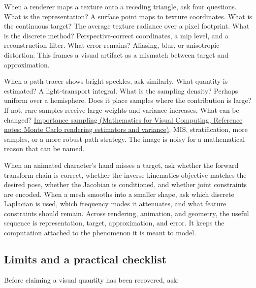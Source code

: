 When a renderer maps a texture onto a receding triangle, ask four questions. What is the representation? A surface point maps to texture coordinates. What is the continuous target? The average texture radiance over a pixel footprint. What is the discrete method? Perspective-correct coordinates, a mip level, and a reconstruction filter. What error remains? Aliasing, blur, or anisotropic distortion. This frames a visual artifact as a mismatch between target and approximation.

When a path tracer shows bright speckles, ask similarly. What quantity is estimated? A light-transport integral. What is the sampling density? Perhaps uniform over a hemisphere. Does it place samples where the contribution is large? If not, rare samples receive large weights and variance increases. What can be changed? \href{../02-Mathematics-for-Visual-Computing/main.pdf\#nameddest=appendix-031e02bf28af}{Importance sampling (Mathematics for Visual Computing, Reference notes: Monte Carlo rendering estimators and variance)}, MIS, stratification, more samples, or a more robust path strategy. The image is noisy for a mathematical reason that can be named.

When an animated character's hand misses a target, ask whether the forward transform chain is correct, whether the inverse-kinematics objective matches the desired pose, whether the Jacobian is conditioned, and whether joint constraints are encoded. When a mesh smooths into a smaller shape, ask which discrete Laplacian is used, which frequency modes it attenuates, and what feature constraints should remain. Across rendering, animation, and geometry, the useful sequence is representation, target, approximation, and error. It keeps the computation attached to the phenomenon it is meant to model.

\subsection{Limits and a practical checklist}\label{04-visual-computing-ii-ch034-limits-and-a-practical-checklist}

Before claiming a visual quantity has been recovered, ask:

